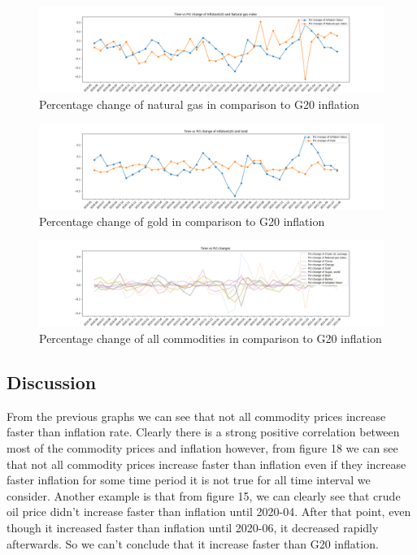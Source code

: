 \documentclass{scrartcl}
\begin{document}
\begin{figure} [H]
	\begin{center}
		\includegraphics[scale=0.3]{Graphics/pct_change_inflation_and_Natural gas index.png}
	\end{center}
	\caption{Percentage change of natural gas in comparison to G20 inflation  }
	\label{fig:log-archi}
\end{figure}

\begin{figure} [H]
	\begin{center}
		\includegraphics[scale=0.3]{Graphics/pct_change_inflation_and_Gold.png}
	\end{center}
	\caption{Percentage change of gold in comparison to G20 inflation  }
	\label{fig:log-archi}
\end{figure}

\begin{figure} [H]
	\begin{center}
		\includegraphics[scale=0.3]{Graphics/pct_changes_together.png}
	\end{center}
	\caption{Percentage change of all commodities in comparison to G20 inflation  }
	\label{fig:log-archi}
\end{figure}


\subsection{Discussion}
From the previous graphs we can see that not all commodity prices increase faster than inflation rate. Clearly there is a strong positive correlation between most of the commodity prices and inflation however, from figure 18 we can see that not all commodity prices increase faster than inflation even if they increase faster inflation for some time period it is not true for all time interval we consider. Another example is that from figure 15, we can clearly see that crude oil price didn't increase faster than inflation until 2020-04. After that point, even though it increased faster than inflation until 2020-06, it decreased rapidly afterwards. So we can't conclude that it increase faster than G20 inflation.
\end{document}
